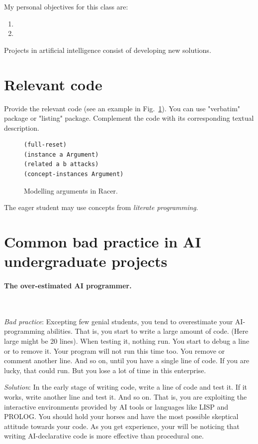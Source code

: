 \documentclass[a4paper,12pt]{report}
\begin{document}
\vspace{0.5cm}

My personal objectives for this class are:
\begin{enumerate}
 \item 
 \item 
\end{enumerate}

Projects in artificial intelligence consist of developing new solutions. 


\section{Relevant code}

Provide the relevant code (see an example in Fig.~\ref{fig:code}).
You can use "verbatim" package or "listing" package. 
Complement the code with its corresponding textual description.

\begin{figure}
\begin{verbatim}
(full-reset)
(instance a Argument)
(related a b attacks)
(concept-instances Argument) 
\end{verbatim}
\caption{Modelling arguments in Racer.}
\label{fig:code} 
\end{figure}

The eager student may use concepts from \textit{literate programming}.

\section{Common bad practice in AI undergraduate projects}

\paragraph{The over-estimated AI programmer.} $ $

{\it Bad practice}: Excepting few genial students, you tend to overestimate your AI-programming abilities. 
That is, you start to write a large amount of code. (Here large might be 20 lines).
When testing it, nothing run. 
You start to debug a line or to remove it.
Your program will not run this time too. 
You remove or comment another line. 
And so on, until you have a single line of code.
If you are lucky, that could run. 
But you lose a lot of time in this enterprise.

{\it Solution}: In the early stage of writing code, write a line of code and test it. 
If it works, write another line and test it. 
And so on. 
That is, you are exploiting the interactive environments provided by 
AI tools or languages like LISP and PROLOG.
You should hold your horses and 
have the most possible skeptical attitude towards your code.  
As you get experience, your will be noticing that writing 
AI-declarative code is more effective than procedural one.  
\end{document}

